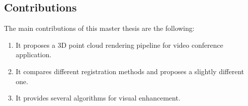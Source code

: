 \subsection{Contributions}
\label{section:thesis_contribution}


The main contributions of this master thesis are the following:

\begin{enumerate}
    \item It proposes a 3D point cloud rendering pipeline for video conference application.
    \item It compares different registration methods and proposes a slightly different one.
    \item It provides several algorithms for visual enhancement.
\end{enumerate}